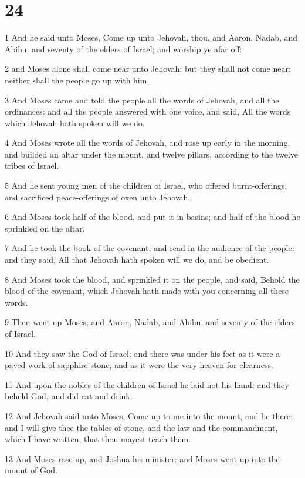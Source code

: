 \chapter{24}

\par 1 And he said unto Moses, Come up unto Jehovah, thou, and Aaron, Nadab, and Abihu, and seventy of the elders of Israel; and worship ye afar off:
\par 2 and Moses alone shall come near unto Jehovah; but they shall not come near; neither shall the people go up with him.
\par 3 And Moses came and told the people all the words of Jehovah, and all the ordinances: and all the people answered with one voice, and said, All the words which Jehovah hath spoken will we do.
\par 4 And Moses wrote all the words of Jehovah, and rose up early in the morning, and builded an altar under the mount, and twelve pillars, according to the twelve tribes of Israel.
\par 5 And he sent young men of the children of Israel, who offered burnt-offerings, and sacrificed peace-offerings of oxen unto Jehovah.
\par 6 And Moses took half of the blood, and put it in basins; and half of the blood he sprinkled on the altar.
\par 7 And he took the book of the covenant, and read in the audience of the people: and they said, All that Jehovah hath spoken will we do, and be obedient.
\par 8 And Moses took the blood, and sprinkled it on the people, and said, Behold the blood of the covenant, which Jehovah hath made with you concerning all these words.
\par 9 Then went up Moses, and Aaron, Nadab, and Abihu, and seventy of the elders of Israel.
\par 10 And they saw the God of Israel; and there was under his feet as it were a paved work of sapphire stone, and as it were the very heaven for clearness.
\par 11 And upon the nobles of the children of Israel he laid not his hand: and they beheld God, and did eat and drink.
\par 12 And Jehovah said unto Moses, Come up to me into the mount, and be there: and I will give thee the tables of stone, and the law and the commandment, which I have written, that thou mayest teach them.
\par 13 And Moses rose up, and Joshua his minister: and Moses went up into the mount of God.
